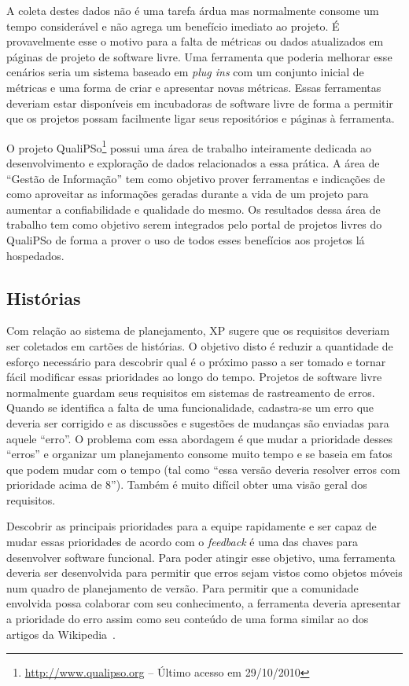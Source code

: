 A coleta destes dados não é uma tarefa árdua mas normalmente consome
um tempo considerável e não agrega um benefício imediato ao projeto. É
provavelmente esse o motivo para a falta de métricas ou dados
atualizados em páginas de projeto de software livre. Uma ferramenta
que poderia melhorar esse cenários seria um sistema baseado em
\emph{plug ins} com um conjunto inicial de métricas e uma forma de
criar e apresentar novas métricas. Essas ferramentas deveriam estar
disponíveis em incubadoras de software livre de forma a permitir que
os projetos possam facilmente ligar seus repositórios e páginas à
ferramenta.

O projeto QualiPSo\footnote{\url{http://www.qualipso.org} -- Último
  acesso em 29/10/2010} possui uma área de trabalho inteiramente
dedicada ao desenvolvimento e exploração de dados relacionados a essa
prática. A área de ``Gestão de Informação'' tem como objetivo prover
ferramentas e indicações de como aproveitar as informações geradas
durante a vida de um projeto para aumentar a confiabilidade e
qualidade do mesmo. Os resultados dessa área de trabalho tem como
objetivo serem integrados pelo portal de projetos livres do QualiPSo
de forma a prover o uso de todos esses benefícios aos projetos lá
hospedados.

\subsection{Histórias}
\label{subsec:stories}

Com relação ao sistema de planejamento, XP sugere que os requisitos
deveriam ser coletados em cartões de histórias. O objetivo disto é
reduzir a quantidade de esforço necessário para descobrir qual é o
próximo passo a ser tomado e tornar fácil modificar essas prioridades
ao longo do tempo. Projetos de software livre normalmente guardam seus
requisitos em sistemas de rastreamento de erros. Quando se identifica
a falta de uma funcionalidade, cadastra-se um erro que deveria ser
corrigido e as discussões e sugestões de mudanças são enviadas para
aquele ``erro''. O problema com essa abordagem é que mudar a
prioridade desses ``erros'' e organizar um planejamento consome muito
tempo e se baseia em fatos que podem mudar com o tempo (tal como
``essa versão deveria resolver erros com prioridade acima de
8''). Também é muito difícil obter uma visão geral dos requisitos.

Descobrir as principais prioridades para a equipe rapidamente e ser
capaz de mudar essas prioridades de acordo com o \emph{feedback} é uma
das chaves para desenvolver software funcional. Para poder atingir
esse objetivo, uma ferramenta deveria ser desenvolvida para permitir
que erros sejam vistos como objetos móveis num quadro de planejamento
de versão. Para permitir que a comunidade envolvida possa colaborar
com seu conhecimento, a ferramenta deveria apresentar a prioridade do
erro assim como seu conteúdo de uma forma similar ao dos artigos da
Wikipedia~\cite{Surowiecki2004,Tapscott2006,Benkler2006}.

